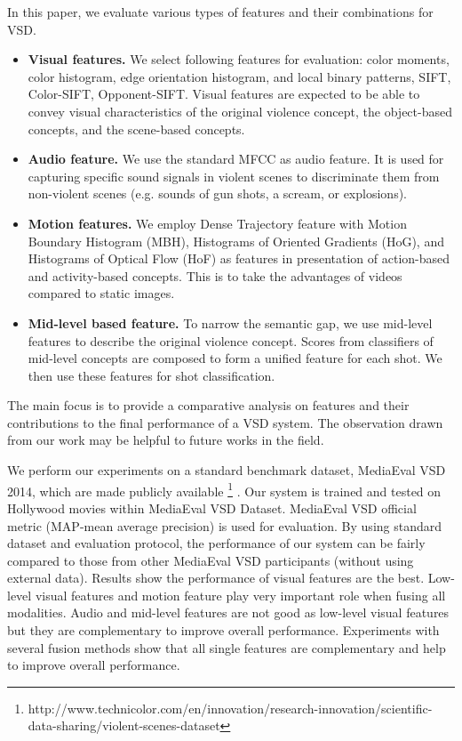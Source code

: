 \documentclass[review]{elsarticle}
\begin{document}
In this paper, we evaluate various types of features and their combinations for VSD. 
\begin{itemize}
	\item {\bf Visual features.} We select following features for evaluation: color moments, color histogram, edge orientation histogram, and local binary patterns, SIFT, Color-SIFT, Opponent-SIFT. Visual features are expected to be able to convey visual characteristics of the original violence concept, the object-based concepts, and the scene-based concepts.
	\item {\bf Audio feature.} We use the standard MFCC as audio feature. It is used for capturing specific sound signals in violent scenes to discriminate them from non-violent scenes (e.g. sounds of gun shots, a scream, or explosions). 
	\item {\bf Motion features.} We employ Dense Trajectory feature with Motion Boundary Histogram (MBH), Histograms of Oriented Gradients (HoG), and Histograms of Optical Flow (HoF) as features in presentation of action-based and activity-based concepts. This is to take the advantages of videos compared to static images.  
	\item {\bf Mid-level based feature.} To narrow the semantic gap, we use mid-level features to describe the original violence concept. Scores from classifiers of mid-level concepts are composed to form a unified feature for each shot. We then use these features for shot classification.
\end{itemize}
The main focus is to provide a comparative analysis on features and their contributions to the final performance of a VSD system. The observation drawn from our work may be helpful to future works in the field.

We perform our experiments on a standard benchmark dataset, MediaEval VSD 2014\cite{demarty2014benchmarking}, which are made publicly available \footnote{http://www.technicolor.com/en/innovation/research-innovation/scientific-data-sharing/violent-scenes-dataset} . Our system is trained and tested on Hollywood movies within MediaEval VSD Dataset. MediaEval VSD official metric (MAP-mean average precision) is used for evaluation. By using standard dataset and evaluation protocol, the performance of our system can be fairly compared to those from other MediaEval VSD participants (without using external data). Results show the performance of visual features are the best. Low-level visual features and motion feature play very important role when fusing all modalities. Audio and mid-level features are not good as low-level visual features but they are complementary to improve overall performance. Experiments with several fusion methods show that all single features are complementary and help to improve overall performance.
\end{document}
